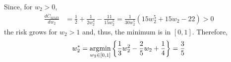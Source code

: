 \begin{solution}
\begin{parts}
Since, for $w_2 >0$,
\begin{align*}
\frac{d\overline{C}_\text{MAD}}{dw_2} 
	&= \frac12 + \frac1{2w_2^4} - \frac{11}{15w_2^5} 
	 = \frac{1}{30w_2^5}\left(15 w_2^5 + 15 w_2 - 22\right) > 0	
\end{align*}
the risk grows for $w_2 > 1$ and, thus, the minimum is in $[0,1]$. Therefore,
\begin{align*}
w_2^* = \operatorname*{argmin}_{w_2\in[0,1]} \left\{\frac13 w_2^2 - \frac25 w_2 + \frac14 \right\} = \frac{3}{5}
\end{align*}

\end{parts}
\end{solution}

\fi